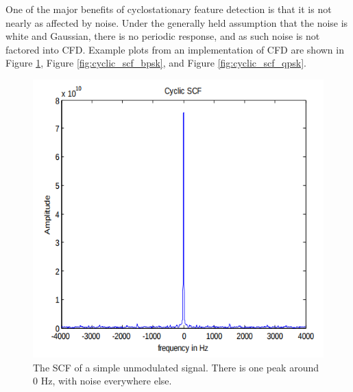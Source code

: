 One of the major benefits of cyclostationary feature detection is that it is not nearly as affected by noise. Under the generally held assumption that the noise is white and Gaussian, there is no periodic response, and as such noise is not factored into CFD. Example plots from an implementation of CFD are shown in Figure \ref{fig:cyclic_scf}, Figure \ref{fig:cyclic_scf_bpsk}, and Figure \ref{fig:cyclic_scf_qpsk}. \par
\begin{figure}[ht!]
\centering
  \includegraphics[scale=0.4]{img/cyclic_scf.png}
\caption{The SCF of a simple unmodulated signal. There is one peak around 0 Hz, with noise everywhere else.}
\label{fig:cyclic_scf}

\end{figure}
